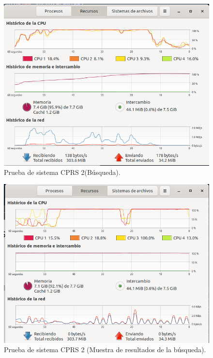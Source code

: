 
\begin{figure}[H]
    \centering
    \includegraphics[scale=0.60]{Capitulo4/Documentos/Casos_de_sistema/imagenes_casos/inicio_busqueda.png}
    \caption{Prueba de sistema CPRS 2(Búsqueda).}
    \label{Evidencia2_1-0}
\end{figure}


\begin{figure}[H]
    \centering
    \includegraphics[scale=0.60]{Capitulo4/Documentos/Casos_de_sistema/imagenes_casos/resultados_busqueda.png}
    \caption{Prueba de sistema CPRS 2 (Muestra de resultados de la búsqueda).}
    \label{Evidencia2_1-1}
\end{figure}


